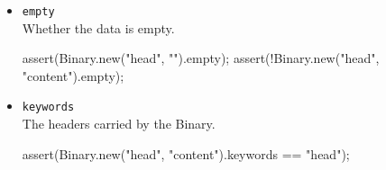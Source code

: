 \begin{itemize}
\item \lstinline|empty|\\
  Whether the data is empty.
\begin{urbiscript}[firstnumber=last]
assert(Binary.new("head", "").empty);
assert(!Binary.new("head", "content").empty);
\end{urbiscript}

\item \lstinline|keywords|\\
  The headers carried by the Binary.
\begin{urbiscript}[firstnumber=last]
assert(Binary.new("head", "content").keywords == "head");
\end{urbiscript}
\end{itemize}


